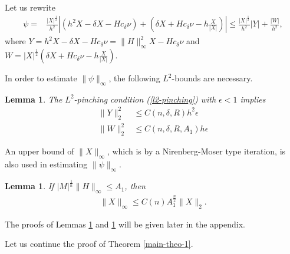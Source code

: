 \documentclass{amsart}
\numberwithin{equation}{section}
\newtheorem{lem}[theo]{Lemma}
\theoremstyle{remark}
\renewcommand{\(}{\left(}
\renewcommand{\)}{\right)}
\renewcommand{\~}{\tilde}
\renewcommand{\-}{\overline}
\renewcommand{\d}{\delta}
\newcommand{\e}{\epsilon}
\begin{document}
Let us rewrite
\begin{equation}\label{4.10}
\begin{split}
\psi=&\frac{|X|^\frac{1}{2}}{h^2}\left|(h^2 X-\d X-H c_\d \nu)+\(\d X+H c_\d \nu-h\frac{X}{|X|}\)\right|\leq \frac{|X|^\frac{1}{2}}{h^2}|Y|+\frac{|W|}{h^2},
\end{split}
\end{equation}
where $Y=h^2 X-\d X-H c_\d \nu=\|H\|_\infty^2 X-H c_\d \nu$ and $W=|X|^\frac{1}{2}\(\d X+H c_\d \nu-h\frac{X}{|X|}\)$.

In order to estimate $\|\psi\|_\infty$, the following $L^2$-bounds are necessary.

\begin{lem}\label{lem-estimate-psi-1}
	The $L^2$-pinching condition (\ref{l2-pinching})
	with $\e<1$ implies
	\begin{align}
	\|Y\|_2^2 & \leq C(n,\d,R)h^2\e \label{ineq-upper-bound-Y}\\
	\|W\|_2^2 & \leq C(n,\d,R,A_1)h \e \label{ineq-upper-bound-W-final}
\end{align}
\end{lem}
An upper bound of $\|X\|_\infty$, which is by a Nirenberg-Moser type iteration, is also used in estimating $\|\psi\|_\infty$.

\begin{lem}\label{lem-infity-bound-position}
	If $|M|^\frac{1}{n}\|H\|_\infty\leq A_1$, then
	\begin{align}\label{ineq-upper-bound-infinity-position}
	\|X\|_\infty\leq C(n)A_1^{\frac{n}{2}} \|X\|_2.
	\end{align}
\end{lem}

The proofs of Lemmas \ref{lem-estimate-psi-1} and \ref{lem-infity-bound-position} will be given later in the appendix.

Let us continue the proof of Theorem \ref{main-theo-1}.
\end{document}
